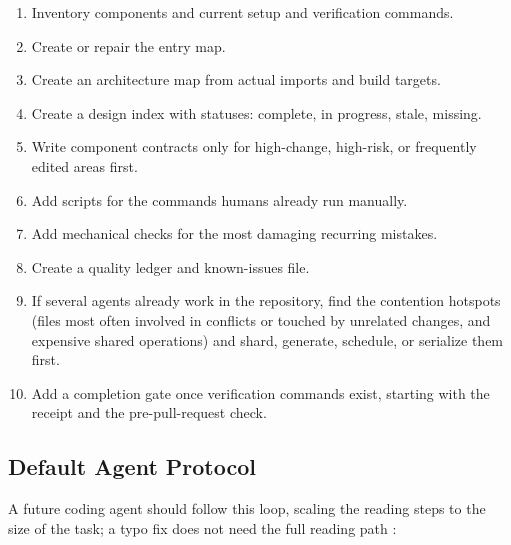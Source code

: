\documentclass[11pt]{article}
\begin{document}
\begin{enumerate}[leftmargin=*]
  \item Inventory components and current setup and verification commands.
  \item Create or repair the entry map.
  \item Create an architecture map from actual imports and build targets.
  \item Create a design index with statuses: complete, in progress, stale, missing.
  \item Write component contracts only for high-change, high-risk, or frequently edited areas first.
  \item Add scripts for the commands humans already run manually.
  \item Add mechanical checks for the most damaging recurring mistakes.
  \item Create a quality ledger and known-issues file.
  \item If several agents already work in the repository, find the contention hotspots (files most often involved in conflicts or touched by unrelated changes, and expensive shared operations) and shard, generate, schedule, or serialize them first.
  \item Add a completion gate once verification commands exist, starting with the receipt and the pre-pull-request check.
\end{enumerate}

\subsection{Default Agent Protocol}
A future coding agent should follow this loop, scaling the reading steps to the size of the task; a typo fix does not need the full reading path \cite{provencher2026astra}:
\end{document}
